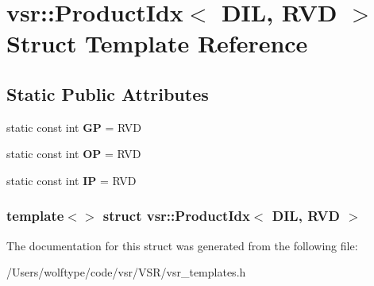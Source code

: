 \hypertarget{structvsr_1_1_product_idx_3_01_d_i_l_00_01_r_v_d_01_4}{\section{vsr\-:\-:Product\-Idx$<$ D\-I\-L, R\-V\-D $>$ Struct Template Reference}
\label{structvsr_1_1_product_idx_3_01_d_i_l_00_01_r_v_d_01_4}
}
\subsection*{Static Public Attributes}
\begin{DoxyCompactItemize}
\item 
\hypertarget{structvsr_1_1_product_idx_3_01_d_i_l_00_01_r_v_d_01_4_a76e376cb15797887f8780af438fe0220}{static const int {\bfseries G\-P} = R\-V\-D}\label{structvsr_1_1_product_idx_3_01_d_i_l_00_01_r_v_d_01_4_a76e376cb15797887f8780af438fe0220}

\item 
\hypertarget{structvsr_1_1_product_idx_3_01_d_i_l_00_01_r_v_d_01_4_a4853462c2f10ecf95993f9381a4a1d8d}{static const int {\bfseries O\-P} = R\-V\-D}\label{structvsr_1_1_product_idx_3_01_d_i_l_00_01_r_v_d_01_4_a4853462c2f10ecf95993f9381a4a1d8d}

\item 
\hypertarget{structvsr_1_1_product_idx_3_01_d_i_l_00_01_r_v_d_01_4_a998095dee17eeec5c2e98714a2105f58}{static const int {\bfseries I\-P} = R\-V\-D}\label{structvsr_1_1_product_idx_3_01_d_i_l_00_01_r_v_d_01_4_a998095dee17eeec5c2e98714a2105f58}

\end{DoxyCompactItemize}
\subsubsection*{template$<$$>$ struct vsr\-::\-Product\-Idx$<$ D\-I\-L, R\-V\-D $>$}



The documentation for this struct was generated from the following file\-:\begin{DoxyCompactItemize}
\item 
/\-Users/wolftype/code/vsr/\-V\-S\-R/vsr\-\_\-templates.\-h\end{DoxyCompactItemize}
